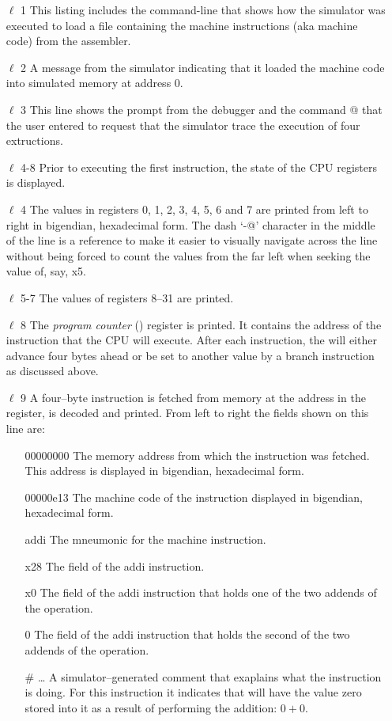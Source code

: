 \begin{itemize}
\item [$\ell$ 1] This listing includes the command-line that shows how the simulator
	was executed to load a file containing the machine instructions (aka
	machine code) from the assembler.
\item [$\ell$ 2] A message from the simulator indicating that it loaded the machine
	code into simulated memory at address 0.
\item [$\ell$ 3] This line shows the prompt from the debugger and the command
	@ that the user entered to request that the simulator trace 
	the execution of four extructions.
\item [$\ell$ 4-8] Prior to executing the first instruction, the state of the
	CPU registers is displayed.  
\item [$\ell$ 4] The values in registers 0, 1, 2, 3, 4, 5, 6 and 7 are printed 
	from left to right in \gls{bigendian}, \gls{hexadecimal} form.  
	The dash `\verb@-@' character in the middle of the line is a reference 
	to make it easier to visually navigate across the line without being
	forced to count the values from the far left when seeking the value 
	of, say, x5.
\item [$\ell$ 5-7] The values of registers 8--31 are printed.
\item [$\ell$ 8] The {\em program counter} () register is printed.  
	It contains the address of the instruction that the CPU will execute.  
	After each instruction, the  will either advance four bytes 
	ahead or be set to another value by a branch instruction as discussed above.
\item [$\ell$ 9] A four--byte instruction is fetched from memory at the address
	in the  register, is decoded and printed.  From left to right
	the fields shown on this line are:

	\begin{itemize}

	\item [00000000] The memory address from which the instruction was
		fetched.  This address is displayed in \gls{bigendian},
		\gls{hexadecimal} form.
	\item [00000e13] The machine code of the instruction displayed in 
		\gls{bigendian}, \gls{hexadecimal} form.
	\item [addi] The mneumonic for the machine instruction.
	\item [x28] The  field of the addi instruction.  
	\item [x0] The  field of the addi instruction that
		holds one of the two addends of the operation.
	\item [0] The  field of the addi instruction that
		holds the second of the two addends of the operation.
	\item [\# \ldots] A simulator--generated comment that exaplains
		what the instruction is doing.  For this instruction it indicates 
		that  will have the value zero stored into it as a result 
		of performing the addition: $0+0$.
	\end{itemize}


\end{itemize}
